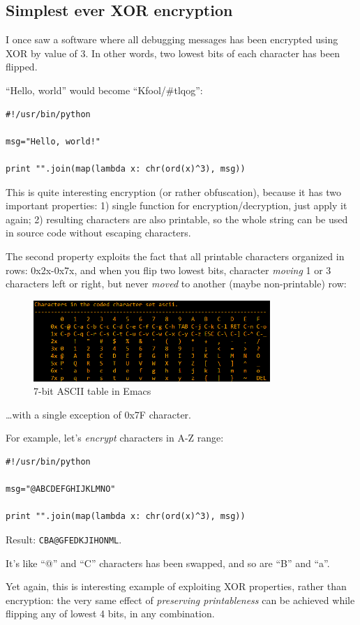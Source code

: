 \subsection{Simplest ever XOR encryption}

I once saw a software where all debugging messages has been encrypted using XOR by value of 3.
In other words, two lowest bits of each character has been flipped.

``Hello, world'' would become ``Kfool/\#tlqog'':

\begin{lstlisting}[caption=Python,style=custompy]
#!/usr/bin/python

msg="Hello, world!"

print "".join(map(lambda x: chr(ord(x)^3), msg))
\end{lstlisting}

This is quite interesting encryption (or rather obfuscation), because it has two important properties:
1) single function for encryption/decryption, just apply it again;
2) resulting characters are also printable, so the whole string can be used in source code without escaping characters.

The second property exploits the fact that all printable characters organized in rows: 0x2x-0x7x, and when you 
flip two lowest bits, character \emph{moving} 1 or 3 characters left or right, but never \emph{moved} to another (maybe
non-printable) row:

\begin{figure}[H]
\centering
\includegraphics[width=0.8\textwidth]{ascii_clean.png}
\caption{7-bit \ac{ASCII} table in Emacs}
\end{figure}

\dots with a single exception of 0x7F character.

For example, let's \emph{encrypt} characters in A-Z range:

\begin{lstlisting}
#!/usr/bin/python

msg="@ABCDEFGHIJKLMNO"

print "".join(map(lambda x: chr(ord(x)^3), msg))
\end{lstlisting}

Result: \verb|CBA@GFEDKJIHONML|.

It's like ``@'' and ``C'' characters has been swapped, and so are ``B'' and ``a''.

Yet again, this is interesting example of exploiting XOR properties, rather than encryption:
the very same effect of \emph{preserving printableness} can be achieved while flipping any of lowest 4 bits,
in any combination.

